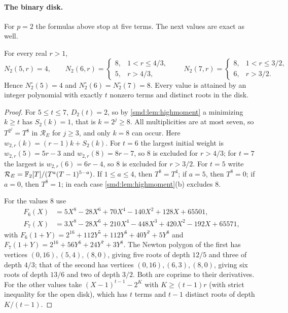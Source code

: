 \paragraph{The binary disk.}
For $p=2$ the formulas above stop at five terms. The next values are exact as well.

\begin{theorem}\label{smd:thm:binary}
For every real $r>1$,
\[
 N_2(5,r)=4,\qquad
 N_2(6,r)=\begin{cases}8,&1<r\le4/3,\\5,&r>4/3,\end{cases}\qquad
 N_2(7,r)=\begin{cases}8,&1<r\le3/2,\\6,&r>3/2.\end{cases}
\]
Hence $N^\circ_2(5)=4$ and $N^\circ_2(6)=N^\circ_2(7)=8$. Every value is attained by an integer
polynomial with exactly $t$ nonzero terms and distinct roots in the disk.
\end{theorem}

\begin{proof}
For $5\le t\le7$, $D_2(t)=2$, so by \cref{smd:lem:highmoment} a minimizing $k\ge t$ has
$S_2(k)=1$, that is $k=2^j\ge8$. All multiplicities are at most seven, so $T^{2^j}=T^8$ in
$\mathcal R_E$ for $j\ge3$, and only $k=8$ can occur. Here $w_{2,r}(k)=(r-1)k+S_2(k)$. For $t=6$
the largest initial weight is $w_{2,r}(5)=5r-3$ and $w_{2,r}(8)=8r-7$, so $8$ is excluded for
$r>4/3$; for $t=7$ the largest is $w_{2,r}(6)=6r-4$, so $8$ is excluded for $r>3/2$. For $t=5$
write $\mathcal R_E=\mathbb{F}_2[T]/(T^a(T-1)^{5-a})$. If $1\le a\le4$, then $T^8=T^4$; if $a=5$, then
$T^8=0$; if $a=0$, then $T^8=1$; in each case \cref{smd:lem:highmoment}(b) excludes $8$.

For the values $8$ use
\begin{align*}
 F_6(X)&=5X^8-28X^6+70X^4-140X^2+128X+65501,\\
 F_7(X)&=3X^8-28X^6+210X^4-448X^3+420X^2-192X+65571,
\end{align*}
with $F_6(1+Y)=2^{16}+112Y^5+112Y^6+40Y^7+5Y^8$ and $F_7(1+Y)=2^{16}+56Y^6+24Y^7+3Y^8$. The
Newton polygon of the first has vertices $(0,16),(5,4),(8,0)$, giving five roots of depth $12/5$
and three of depth $4/3$; that of the second has vertices $(0,16),(6,3),(8,0)$, giving six roots of
depth $13/6$ and two of depth $3/2$. Both are coprime to their derivatives. For the other values
take $(X-1)^{t-1}-2^K$ with $K\ge(t-1)r$ (with strict inequality for the open disk), which has $t$
terms and $t-1$ distinct roots of depth $K/(t-1)$.
\end{proof}

